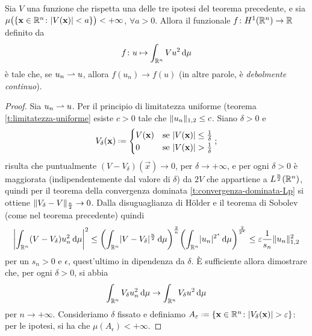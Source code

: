 \begin{teorema}
    Sia $V$ una funzione che rispetta una delle tre ipotesi del teorema precedente, e sia $\mu\bigl(\{\vec x\in\R^n\colon \abs{V(\vec x)}<a\}\bigr)<+\infty$, $\forall a>0$.
    Allora il funzionale $f\colon\sobH[1]{\R^n}\to\R$ definito da
    \begin{equation}
        f\colon u\mapsto\int_{\R^n}Vu^2\,\dd\mu
    \end{equation}
    è tale che, se $u_n\weakto u$, allora $f(u_n)\to f(u)$ (in altre parole, è \emph{debolmente continuo}).
\end{teorema}
\begin{proof}
    Sia $u_n\weakto u$.
    Per il principio di limitatezza uniforme (teorema \ref{t:limitatezza-uniforme} esiste $c>0$ tale che $\norm{u_n}_{1,2}\le c$.
    Siano $\delta>0$ e
    \begin{equation}
        V_\delta(\vec x)\defeq
        \begin{cases}
            V(\vec x) & \text{se }\abs{V(\vec x)}\le\frac1{\delta}\\
            0         & \text{se }\abs{V(\vec x)}>\frac1{\delta}
        \end{cases};
    \end{equation}
    risulta che puntualmente $(V-V_\delta)(\vec x)\to 0$, per $\delta\to+\infty$, e per ogni $\delta>0$ è maggiorata (indipendentemente dal valore di $\delta$) da $2V$ che appartiene a $\leb[\frac{n}2]{\R^n}$, quindi per il teorema della convergenza dominata \ref{t:convergenza-dominata-Lp} si ottiene $\norm{V_\delta-V}_\frac{n}2\to 0$.
    Dalla disuguaglianza di Hölder e il teorema di Sobolev (come nel teorema precedente) quindi
    \begin{equation}
        \abs[\bigg]{\int_{\R^n}(V-V_\delta)u_n^2\,\dd\mu}^2\le
        \biggl(\int_{\R^n}\abs{V-V_\delta}^\frac{n}2\,\dd\mu\biggr)^\frac2{n}\biggl(\int_{\R^n}\abs{u_n}^{\sobc 2}\,\dd\mu\biggr)^\frac2{\sobc 2}\le
        \epsilon\frac1{s_n}\norm{u_n}_{1,2}^2
    \end{equation}
    per un $s_n>0$ e $\epsilon$, quest'ultimo in dipendenza da $\delta$.
    È sufficiente allora dimostrare che, per ogni $\delta>0$, si abbia
    \begin{equation}
        \int_{\R^n}V_\delta u_n^2\,\dd\mu\to\int_{\R^n}V_\delta u^2\,\dd\mu
    \end{equation}
    per $n\to+\infty$.
    Consideriamo $\delta$ fissato e definiamo $A_\epsilon\defeq\{\vec x\in\R^n\colon\abs{V_\delta(\vec x)}>\epsilon\}$: per le ipotesi, si ha che $\mu(A_\epsilon)<+\infty$.

\end{proof}
